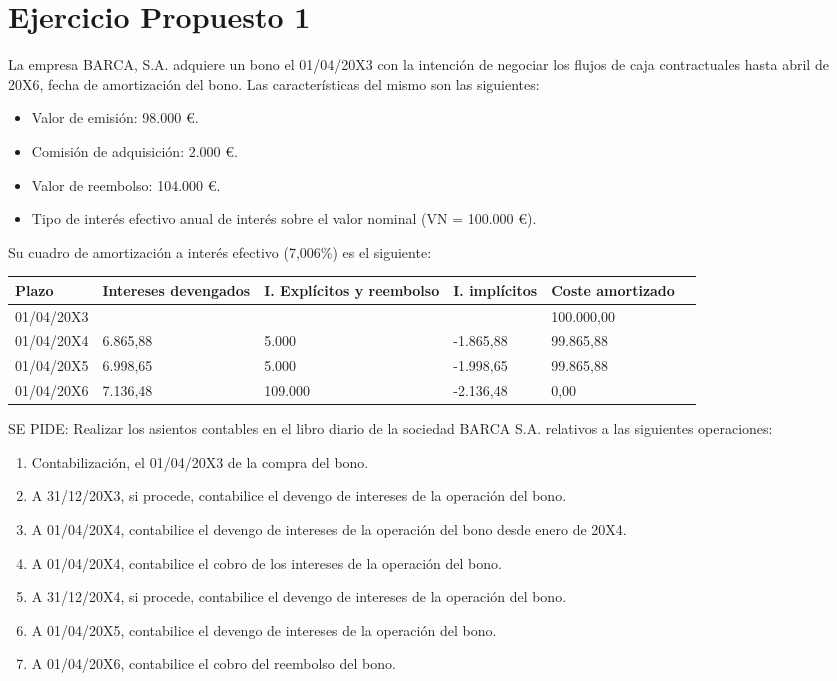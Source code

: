\section{Ejercicio Propuesto 1}


La empresa BARCA, S.A. adquiere un bono el 01/04/20X3 con la intención de negociar los flujos de caja contractuales hasta abril de 20X6, fecha de amortización del bono. Las características del mismo son las siguientes:
\begin{itemize}
    \item Valor de emisión: 98.000 €.
    \item Comisión de adquisición: 2.000 €.
    \item Valor de reembolso: 104.000 €.
    \item Tipo de interés efectivo anual de interés sobre el valor nominal (VN = 100.000 €).
\end{itemize}

Su cuadro de amortización a interés efectivo (7,006\%) es el siguiente:
\begin{table}
\centering
\begin{tabular}{|p{2cm}|p{2cm}|p{2cm}|p{2cm}|p{2cm}|p{2cm}}
    \hline
    Plazo & Intereses devengados & I. Explícitos y reembolso & I. implícitos & Coste amortizado \\
    \hline
    01/04/20X3 & & & & 100.000,00 \\
    \hline
    01/04/20X4 & 6.865,88 & 5.000 & -1.865,88 & 99.865,88 \\
    \hline
    01/04/20X5 & 6.998,65 & 5.000 & -1.998,65 & 99.865,88 \\
    \hline
    01/04/20X6 & 7.136,48 & 109.000 & -2.136,48 & 0,00 \\
    \hline
    \end{tabular}
\end{table}


SE PIDE: Realizar los asientos contables en el libro diario de la sociedad BARCA S.A. relativos a las siguientes operaciones:

\begin{enumerate}[label=\alph*)] %
    \item Contabilización, el 01/04/20X3 de la compra del bono.
    \item A 31/12/20X3, si procede, contabilice el devengo de intereses de la operación del bono.
    \item A 01/04/20X4, contabilice el devengo de intereses de la operación del bono desde enero de 20X4.
    \item A 01/04/20X4, contabilice el cobro de los intereses de la operación del bono.
    \item A 31/12/20X4, si procede, contabilice el devengo de intereses de la operación del bono.
    \item A 01/04/20X5, contabilice el devengo de intereses de la operación del bono.
    \item A 01/04/20X6, contabilice el cobro del reembolso del bono.
\end{enumerate}


